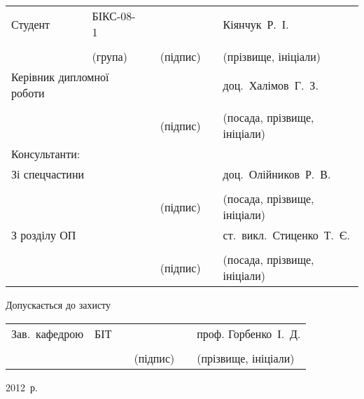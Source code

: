 \begin{titlepage}
\begin{center}
        \begin{tabular}{
            p{}
            >{\centering\arraybackslash}p{}
            >{\centering\arraybackslash}p{}
            >{\centering\arraybackslash}p{}
            >{\centering\arraybackslash}p{}
            >{\centering\arraybackslash}p{}}
            Студент & БІКС-08-1 & & & & Кіянчук~Р.~І. \\ \cline{2-2}\cline{4-4}\cline{6-6} \\[-4ex]
            & {\scriptsize (група)} & & {\scriptsize (підпис)} & & {\scriptsize (прізвище, ініціали)} \\[1ex]
            \multicolumn{2}{p{0.4\textwidth}}{Керівник дипломної роботи} & & & & доц.~Халімов~Г.~З. \\ \cline{4-4}\cline{6-6} \\[-4ex]
            & & & {\scriptsize (підпис)} & & {\scriptsize (посада, прізвище, ініціали)} \\
            Консультанти: & & & & & \\[1ex]
            \multicolumn{2}{p{0.4\textwidth}}{Зі спецчастини} & & & & доц.~Олійников~Р.~В. \\ \cline{4-4}\cline{6-6} \\[-4ex]
            & & & {\scriptsize (підпис)} & & {\scriptsize (посада, прізвище, ініціали)} \\[1ex]
            \multicolumn{2}{p{0.4\textwidth}}{З розділу ОП} & & & & \mbox{ст.~викл.~Стиценко~Т.~Є.} \\ \cline{4-4}\cline{6-6} \\[-4ex]
            & & & {\scriptsize (підпис)} & & {\scriptsize (посада, прізвище, ініціали)} \\[1ex]
        \end{tabular}

        \vfill
        \begin{flushleft}
            \hspace{4ex}Допускається до захисту \\[1ex]
        \end{flushleft}
        \begin{tabular}{
            p{}
            >{\centering\arraybackslash}p{}
            >{\centering\arraybackslash}p{}
            >{\centering\arraybackslash}p{}
            >{\centering\arraybackslash}p{}
            >{\centering\arraybackslash}p{}}
            \mbox{Зав. кафедрою} & БІТ & & & & проф. Горбенко~І.~Д. \\ \cline{2-2}\cline{4-4}\cline{6-6} \\[-4ex]
            & & & {\scriptsize (підпис)} & & {\scriptsize (прізвище, ініціали)} \\[1ex]
        \end{tabular}
        \vfill
        2012~р.
    \end{center}
\end{titlepage}
\newpage

\addtocounter{page}{1}
